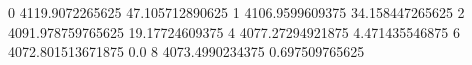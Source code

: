 0 4119.9072265625 47.105712890625
1 4106.9599609375 34.158447265625
2 4091.978759765625 19.17724609375
4 4077.27294921875 4.471435546875
6 4072.801513671875 0.0
8 4073.4990234375 0.697509765625
